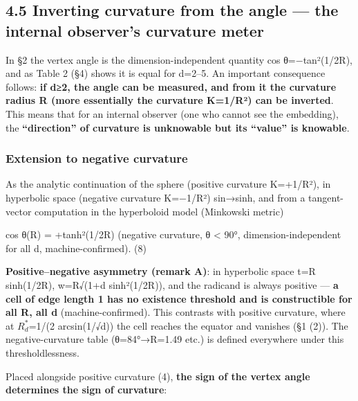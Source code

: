 \documentclass[
]{ltjsarticle}
\begin{document}
\subsection{4.5 Inverting curvature from the angle --- the internal
observer's curvature
meter}\label{inverting-curvature-from-the-angle-the-internal-observers-curvature-meter}

In §2 the vertex angle is the dimension-independent quantity cos
θ=−tan²(1/2R), and as Table 2 (§4) shows it is equal for d=2--5. An
important consequence follows: \textbf{if d≥2, the angle can be
measured, and from it the curvature radius R (more essentially the
curvature K=1/R²) can be inverted}. This means that for an internal
observer (one who cannot see the embedding), the \textbf{``direction''
of curvature is unknowable but its ``value'' is knowable}.

\subsubsection{Extension to negative
curvature}\label{extension-to-negative-curvature}

As the analytic continuation of the sphere (positive curvature K=+1/R²),
in hyperbolic space (negative curvature K=−1/R²) sin→sinh, and from a
tangent-vector computation in the hyperboloid model (Minkowski metric)

cos θ(R) = +tanh²(1/2R) (negative curvature, θ \textless{} 90°,
dimension-independent for all d, machine-confirmed). (8)

\textbf{Positive--negative asymmetry (remark A)}: in hyperbolic space
t=R sinh(1/2R), w=R√(1+d sinh²(1/2R)), and the radicand is always
positive --- \textbf{a cell of edge length 1 has no existence threshold
and is constructible for all R, all d} (machine-confirmed). This
contrasts with positive curvature, where at \(R^{*}_{d}\)=1/(2
arcsin(1/√d)) the cell reaches the equator and vanishes (§1 (2)). The
negative-curvature table (θ=84°→R=1.49 etc.) is defined everywhere under
this thresholdlessness.

Placed alongside positive curvature (4), \textbf{the sign of the vertex
angle determines the sign of curvature}:
\end{document}

